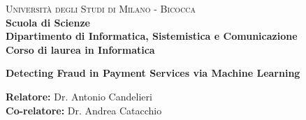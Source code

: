 \documentclass[11pt,oneside]{book}
\begin{document}
    \begin{titlepage}
            
        \noindent
        \begin{minipage}[t]{0.19\textwidth}
        \end{minipage}
        \begin{minipage}[t]{0.81\textwidth}
        {
                {\textsc{Università degli Studi di Milano - Bicocca}} \\
                \textbf{Scuola di Scienze} \\
                \textbf{Dipartimento di Informatica, Sistemistica e Comunicazione} \\
                \textbf{Corso di laurea in Informatica} \\
                \par
        }
        \end{minipage}
            
    	\vspace{35mm}
            
    	\begin{center}
            {\Huge{
                    \textbf{Detecting Fraud in Payment Services via Machine Learning}
                    \par
                }
            }
        \end{center}
            
        \vspace{35mm}
    
        \noindent
            {\large \textbf{Relatore:} Dr. Antonio Candelieri} \\

        \noindent
            {\large \textbf{Co-relatore:} Dr. Andrea Catacchio}
            

\end{titlepage}
\end{document}
